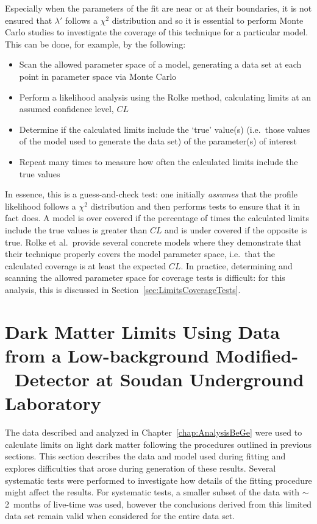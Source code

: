  Especially when the parameters of the fit are near or at their boundaries, it is not ensured that $\lambda'$ follows a $\chi^{2}$ distribution and so it is essential to perform Monte Carlo studies to investigate the coverage of this technique for a particular model.  This can be done, for example, by the following:
		\begin{itemize}
			\item Scan the allowed parameter space of a model, 
			generating a data set at each point in parameter space via Monte Carlo
			\item Perform a likelihood analysis using the Rolke method, calculating limits at an 
			assumed confidence level, $CL$
			\item Determine if the calculated limits include the `true' value(s) (i.e.~those values of 
			the model used to generate the data set) of the parameter(s) of interest 
			\item Repeat many times to measure how often the calculated limits include the true values
		\end{itemize}			
In essence, this is a guess-and-check test: one initially \emph{assumes} that the profile likelihood follows a $\chi^{2}$ distribution and then performs tests to ensure that it in fact does.  A model is over covered if the percentage of times the calculated limits include the true values is greater than $CL$ and is under covered if the opposite is true.  Rolke et al.~provide several concrete models where they demonstrate that their technique properly covers the model parameter space, i.e.~that the calculated coverage is at least the expected $CL$.  In practice, determining and scanning the allowed parameter space for coverage tests is difficult: for this analysis, this is discussed in Section~\ref{sec:LimitsCoverageTests}.


\section{Dark Matter Limits Using Data from a Low-background Modified-\bege~Detector at Soud\-an Underground Laboratory} 
\label{sec:DMLimitsWithSoudan}

	The data described and analyzed in Chapter~\ref{chap:AnalysisBeGe} were used to calculate limits on light dark matter following the procedures outlined in previous sections.  This section describes the data and model used during fitting and explores difficulties that arose during generation of these results.  Several systematic tests were performed to investigate how details of the fitting procedure might affect the results.  For systematic tests, a smaller subset of the data with $\sim$2~months of live-time was used, however the conclusions derived from this limited data set remain valid when considered for the entire data set.

